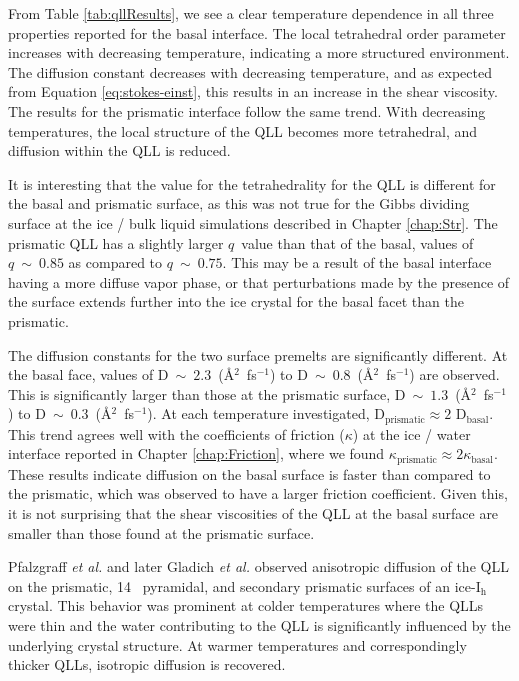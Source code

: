 From Table \ref{tab:qllResults}, we see a clear temperature dependence
in all three properties reported for the basal interface. The local
tetrahedral order parameter increases with decreasing temperature,
indicating a more structured environment. The diffusion constant
decreases with decreasing temperature, and as expected from Equation
\eqref{eq:stokes-einst}, this results in an increase in the shear
viscosity.  The results for the prismatic interface follow the same
trend. With decreasing temperatures, the local structure of the QLL
becomes more tetrahedral, and diffusion within the QLL is reduced. 

It is interesting that the value for the tetrahedrality for the QLL is
different for the basal and prismatic surface, as this was not true
for the Gibbs dividing surface at the ice / bulk liquid simulations
described in Chapter \ref{chap:Str}. The prismatic QLL has a slightly
larger $q$~value than that of the basal, values of $q~\sim~0.85$ as
compared to $q~\sim~0.75$.  This may be a result of the basal interface
having a more diffuse vapor phase, or that perturbations made by the
presence of the surface extends further into the ice crystal for the
basal facet than the prismatic.

The diffusion constants for the two surface premelts are significantly
different. At the basal face, values of
$\mathrm{D}~\sim~2.3$~(\AA$^{2}$~fs$^{-1}$) to
$\mathrm{D}~\sim~0.8$~(\AA$^{2}$~fs$^{-1}$) are observed. This is
significantly larger than those at the prismatic surface,
$\mathrm{D}~\sim~1.3$~(\AA$^{2}$~fs$^{-1}$) to
$\mathrm{D}~\sim~0.3$~(\AA$^{2}$~fs$^{-1}$). At each temperature
investigated, D$_\mathrm{prismatic} \approx 2$
D$_\mathrm{basal}$. This trend agrees well with the coefficients of
friction ($\kappa$) at the ice / water interface reported in Chapter
\ref{chap:Friction}, where we found
$\kappa_\mathrm{prismatic} \approx 2 \kappa_\mathrm{basal}$. These
results indicate diffusion on the basal surface is faster than
compared to the prismatic, which was observed to have a larger
friction coefficient. Given this, it is not surprising that the shear
viscosities of the QLL at the basal surface are smaller than those
found at the prismatic surface.

Pfalzgraff \textit{et al.}\cite{Pfalzgraff2011} and later Gladich
\textit{et al.}\cite{Gladich2011,Gladich2015} observed anisotropic
diffusion of the QLL on the prismatic, 14\degree~ pyramidal, and
secondary prismatic surfaces of an ice-I$_\mathrm{h}$ crystal. This
behavior was prominent at colder temperatures where the QLLs were thin
and the water contributing to the QLL is significantly influenced by the
underlying crystal structure. At warmer temperatures and
correspondingly thicker QLLs, isotropic diffusion is recovered. 

